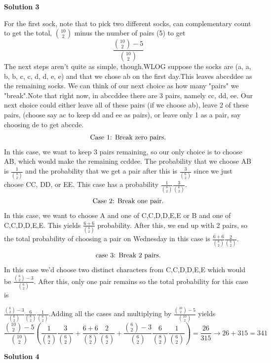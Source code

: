 \begin{enumerate}
 



\textbf{Solution 3}

For the first sock, note that to pick two different socks, can complementary count to get the total, $\binom{10}{2}$ minus the number of pairs (5) to get 
 \[\frac{\binom{10}{2} - 5}{\binom{10}{2}}\]The next steps aren't quite as simple, though.WLOG suppose the socks are (a, a, b, b, c, c, d, d, e, e) and that we chose ab on the first day.This leaves abccddee as the remaining socks. We can think of our next choice as how many "pairs" we "break".Note that right now, in abccddee there are 3 pairs, namely {cc, dd, ee}. Our next choice could either leave all of these pairs (if we choose ab), leave 2 of these pairs, (choose say ac to keep dd and ee as pairs), or leave only 1 as a pair, say choosing de to get abccde.
 \[\bold{\text{Case 1: Break zero pairs}}.\] In this case, we want to keep 3 pairs remaining, so our only choice is to choose AB, which would make the remaining ccddee. The probability that we choose AB is $\frac{1}{\binom{8}{2}}$ and the probability that we get a pair after this is $\frac{3}{\binom{6}{2}}$ since we just choose CC, DD, or EE. This case has a probability $\frac{1}{\binom{8}{2}}\frac{3}{\binom{6}{2}}.$
 \[\bold{\text{Case 2: Break one pair}}.\]In this case, we want to choose A and one of {C,C,D,D,E,E} or B and one of {C,C,D,D,E,E}. This yields $\frac{6 + 6}{\binom{8}{2}}$ probability. After this, we end up with 2 pairs, so the total probability of choosing a pair on Wednesday in this case is $\frac{6 + 6}{\binom{8}{2}}\frac{2}{\binom{6}{2}}.$
 \[\bold{\text{case 3: Break 2 pairs}}.\]In this case we'd choose two distinct characters from {C,C,D,D,E,E} which would be $\frac{\binom{6}{2} - 3}{\binom{6}{2}}.$ After this, only one pair remains so the total probability for this case is

 $\frac{\binom{6}{2} - 3}{\binom{6}{2}}    \frac{6}{\binom{8}{2}}\frac{1}{\binom{6}{2}}.$Adding all the cases and multiplying by $\frac{\binom{10}{2} - 5}{\binom{10}{2}}$ yields
 \[\frac{\binom{10}{2} - 5}{\binom{10}{2}}\left(\frac{1}{\binom{8}{2}}\frac{3}{\binom{6}{2}}+\frac{6 + 6}{\binom{8}{2}}\frac{2}{\binom{6}{2}}+ \frac{\binom{6}{2} - 3}{\binom{6}{2}}\frac{6}{\binom{8}{2}}\frac{1}{\binom{6}{2}}\right) = \frac{26}{315} \rightarrow 26 + 315 = \boxed{341}\]




\textbf{Solution 4}


\end{enumerate}
